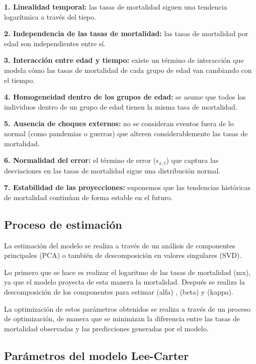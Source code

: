 \documentclass[
]{article}
\begin{document}
\textbf{1. Linealidad temporal:} las tasas de mortalidad siguen una
tendencia logarítmica a través del tiepo.

\textbf{2. Independencia de las tasas de mortalidad:} las tasas de
mortalidad por edad son independientes entre sí.

\textbf{3. Interacción entre edad y tiempo:} existe un término de
interacción que modela cómo las tasas de mortalidad de cada grupo de
edad van cambiando con el tiempo.

\textbf{4. Homogeneidad dentro de los grupos de edad:} se asume que
todos los individuos dentro de un grupo de edad tienen la misma tasa de
mortalidad.

\textbf{5. Ausencia de choques externos:} no se consideran eventos fuera
de lo normal (como pandemias o guerras) que alteren considerablemente
las tasas de mortalidad.

\textbf{6. Normalidad del error:} el término de error
(\(\epsilon_{x,t}\)) que captura las desviaciones en las tasas de
mortalidad sigue una distribución normal.

\textbf{7. Estabilidad de las proyecciones:} suponemos que las
tendencias históricas de mortalidad continúan de forma estable en el
futuro.

\clearpage

\hypertarget{proceso-de-estimaciuxf3n}{%
\subsection{Proceso de estimación}\label{proceso-de-estimaciuxf3n}}

La estimación del modelo se realiza a través de un análisis de
componentes principales (PCA) o también de descomposición en valores
singulares (SVD).

Lo primero que se hace es realizar el logaritmo de las tasas de
mortalidad (mx), ya que el modelo proyecta de esta manera la mortalidad.
Después se realiza la descomposición de los componentes para estimar
(alfa) , (beta) y (kappa).

La optimización de estos parámetros obtenidos se realiza a través de un
proceso de optimización, de manera que se minimizan la diferencia entre
las tasas de mortalidad observadas y las predicciones generadas por el
modelo.

\hypertarget{paruxe1metros-del-modelo-lee-carter}{%
\subsection{Parámetros del modelo
Lee-Carter}\label{paruxe1metros-del-modelo-lee-carter}}
\end{document}
